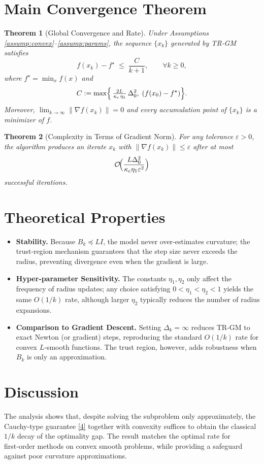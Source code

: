 \documentclass{article}
\newtheorem{theorem}{Theorem}
\newcommand{\norm}[1]{\left\lVert#1\right\rVert}
\begin{document}
\section*{Main Convergence Theorem}
\begin{theorem}[Global Convergence and Rate]\label{thm:main}
Under Assumptions \ref{assump:convex}–\ref{assump:params}, the sequence $\{x_k\}$ generated by TR‑GM satisfies
\[
f(x_k)-f^\star \;\le\; \frac{C}{k+1},
\qquad\forall k\ge0,
\tag{5}
\]
where $f^\star=\min_x f(x)$ and
\[
C:=\max\Bigl\{\,\tfrac{2L}{\kappa_{\mathrm{c}}\,\eta_1}\,
\Delta_{0}^{2},\; (f(x_0)-f^\star)\Bigr\}.
\]
Moreover, $\lim_{k\to\infty}\norm{\nabla f(x_k)}=0$ and every accumulation point of $\{x_k\}$ is a minimizer of $f$.
\end{theorem}
\begin{theorem}[Complexity in Terms of Gradient Norm]\label{thm:grad}
For any tolerance $\varepsilon>0$, the algorithm produces an iterate $x_k$ with
$\norm{\nabla f(x_k)}\le\varepsilon$ after at most
\[
\mathcal{O}\!\Bigl(\frac{L\Delta_0^2}{\kappa_{\mathrm{c}}\eta_1\varepsilon^{2}}\Bigr)
\]
successful iterations.
\end{theorem}

\section*{Theoretical Properties}
\begin{itemize}
\item \textbf{Stability.}  Because $B_k\preceq L I$, the model never over‑estimates curvature; the trust‑region mechanism guarantees that the step size never exceeds the radius, preventing divergence even when the gradient is large.
\item \textbf{Hyper‑parameter Sensitivity.}  The constants $\eta_1,\eta_2$ only affect the frequency of radius updates; any choice satisfying $0<\eta_1<\eta_2<1$ yields the same $O(1/k)$ rate, although larger $\eta_2$ typically reduces the number of radius expansions.
\item \textbf{Comparison to Gradient Descent.}  Setting $\Delta_k=\infty$ reduces TR‑GM to exact Newton (or gradient) steps, reproducing the standard $O(1/k)$ rate for convex $L$‑smooth functions. The trust region, however, adds robustness when $B_k$ is only an approximation.
\end{itemize}

\section*{Discussion}
The analysis shows that, despite solving the subproblem only approximately, the Cauchy‑type guarantee \eqref{4} together with convexity suffices to obtain the classical $1/k$ decay of the optimality gap. The result matches the optimal rate for first‑order methods on convex smooth problems, while providing a safeguard against poor curvature approximations.
\end{document}
